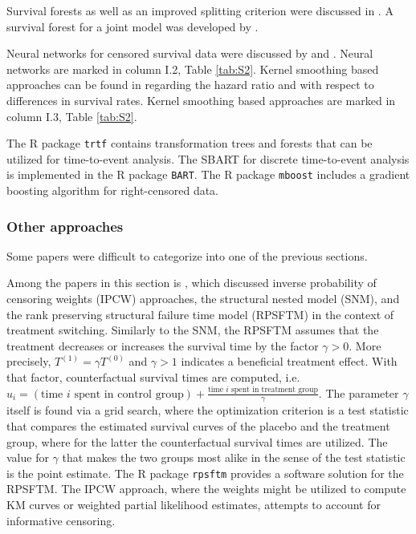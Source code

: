 \noindent Survival forests as well as an improved splitting criterion were discussed in \cite{Korepanova.2020}. A survival forest for a joint model was developed by \cite{Lin.2021}.

\noindent Neural networks for censored survival data were discussed by \cite{Trinh.2003} and \cite{Laurentiis.1994} . 
Neural networks are marked in column I.2, Table \ref{tab:S2}.
Kernel smoothing based approaches can be found in \cite{Cheng.2009} regarding the hazard ratio and \cite{Zhao.2019} with respect to differences in survival rates. Kernel smoothing based approaches are marked in column I.3, Table \ref{tab:S2}.


\noindent The R package \texttt{trtf} contains transformation trees and forests that can be utilized for time-to-event analysis. The SBART for discrete time-to-event analysis is implemented in the R package \texttt{BART}. The R package \texttt{mboost} includes a gradient boosting algorithm for right-censored data.

\noindent 

\subsubsection{Other approaches}\label{other_estimation}

\noindent 

 \noindent Some papers were difficult to categorize into one of the previous sections.

\noindent Among the papers in this section is \cite{Latminer.2018}, which discussed inverse probability of censoring weights (IPCW) approaches, the structural nested model (SNM), and the rank preserving structural failure time model (RPSFTM) in the context of treatment switching.
Similarly to the SNM, the RPSFTM assumes that the treatment decreases or increases the survival time by the factor $\gamma>0$.
More precisely, $T^{(1)}=\gamma T^{(0)}$ and $\gamma>1$ indicates a beneficial treatment effect.
With that factor, counterfactual survival times are computed, i.e. $u_i=(\text{time $i$ spent in control group}) + \frac{\text{time $i$ spent in treatment group}}{\gamma}$.
The parameter $\gamma$ itself is found via a grid search, where the optimization criterion is a test statistic that compares the estimated survival curves of the placebo and the treatment group, where for the latter the counterfactual survival times are utilized. 
The value for $\gamma$ that makes the two groups most alike in the sense of the test statistic is the point estimate. The R package \texttt{rpsftm} provides a software solution for the RPSFTM.
The IPCW approach, where the weights might be utilized to compute KM curves or weighted partial likelihood estimates, attempts to account for informative censoring.

